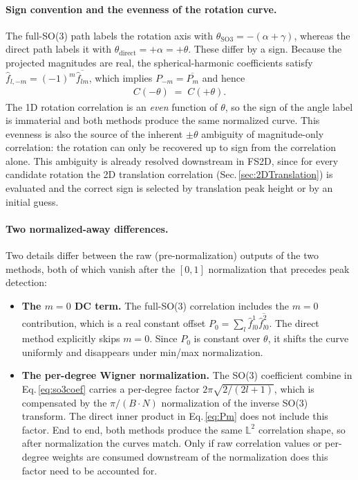 \paragraph{Sign convention and the evenness of the rotation curve.}
The full-SO(3) path labels the rotation axis with $\theta_{\text{SO3}}=
-(\alpha+\gamma)$, whereas the direct path labels it with $\theta_{\text{direct}}
=+\alpha=+\theta$. These differ by a sign. Because the projected magnitudes are
real, the spherical-harmonic coefficients satisfy
$\hat{f}_{l,-m}=(-1)^{m}\overline{\hat{f}_{lm}}$, which implies
$P_{-m}=\overline{P_{m}}$ and hence
\begin{align}
    C(-\theta) \;=\; C(+\theta).
    \label{eq:evenness}
\end{align}
The 1D rotation correlation is an \emph{even} function of $\theta$, so the
sign of the angle label is immaterial and both methods produce the same
normalized curve. This evenness is also the source of the inherent
$\pm\theta$ ambiguity of magnitude-only correlation: the rotation can only be
recovered up to sign from the correlation alone. This ambiguity is already
resolved downstream in FS2D, since for every candidate rotation the 2D
translation correlation (Sec.\,\ref{sec:2DTranslation}) is evaluated and the
correct sign is selected by translation peak height or by an initial guess.

\paragraph{Two normalized-away differences.}
Two details differ between the raw (pre-normalization) outputs of the two
methods, both of which vanish after the $[0,1]$ normalization that precedes peak
detection:
\begin{itemize}
    \item \textbf{The $m=0$ DC term.} The full-SO(3) correlation includes the
          $m=0$ contribution, which is a real constant offset
          $P_{0}=\sum_{l}\hat{f}^{1}_{l0}\overline{\hat{f}^{2}_{l0}}$. The direct
          method explicitly skips $m=0$. Since $P_{0}$ is constant over $\theta$,
          it shifts the curve uniformly and disappears under min/max
          normalization.
    \item \textbf{The per-degree Wigner normalization.} The SO(3) coefficient
          combine in Eq.\,\ref{eq:so3coef} carries a per-degree factor
          $2\pi\sqrt{2/(2l+1)}$, which is compensated by the
          $\pi/(B\!\cdot\!N)$ normalization of the inverse SO(3) transform.
          The direct inner product in Eq.\,\ref{eq:Pm} does not include this
          factor. End to end, both methods produce the same $\mathbb{L}^{2}$
          correlation shape, so after normalization the curves match. Only if
          raw correlation values or per-degree weights are consumed downstream
          of the normalization does this factor need to be accounted for.
\end{itemize}

